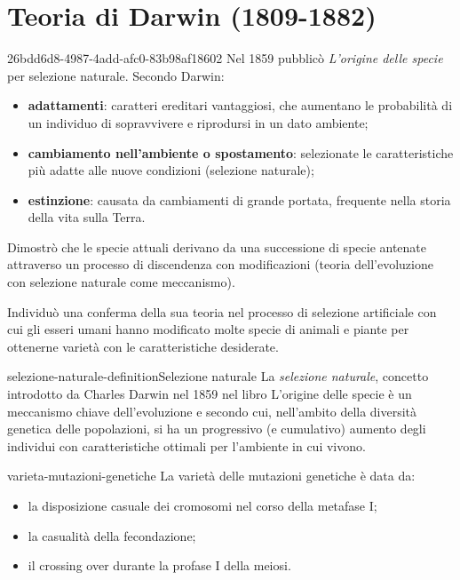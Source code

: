 \documentclass[preview]{standalone}
\begin{document}
\section{Teoria di Darwin (1809-1882)}

\begin{snippet}{26bdd6d8-4987-4add-afc0-83b98af18602}
    Nel 1859 pubblicò \textit{L'origine delle specie} per selezione naturale.
    Secondo Darwin:
    \begin{itemize}
        \item \textbf{adattamenti}: caratteri ereditari vantaggiosi, che aumentano le
            probabilità di un individuo di sopravvivere e riprodursi in un dato
            ambiente;
        \item \textbf{cambiamento nell'ambiente o spostamento}: selezionate le
        caratteristiche più adatte alle nuove condizioni (selezione naturale);
        \item \textbf{estinzione}: causata da cambiamenti di grande portata, frequente nella
        storia della vita sulla Terra.
    \end{itemize}

    Dimostrò che le specie attuali derivano da una successione di specie
    antenate attraverso un processo di discendenza con modificazioni
    (teoria dell'evoluzione con selezione naturale come meccanismo).

    Individuò una conferma della sua teoria nel processo di selezione
    artificiale con cui gli esseri umani hanno modificato molte specie di
    animali e piante per ottenerne varietà con le caratteristiche desiderate.
\end{snippet}

\begin{snippetdefinition}{selezione-naturale-definition}{Selezione naturale}
    La \textit{selezione naturale}, concetto introdotto da Charles Darwin
    nel 1859 nel libro L'origine delle specie è un meccanismo chiave dell'evoluzione
    e secondo cui, nell'ambito della diversità genetica delle popolazioni,
    si ha un progressivo (e cumulativo) aumento degli individui con caratteristiche
    ottimali per l'ambiente in cui vivono.
\end{snippetdefinition}

\begin{snippet}{varieta-mutazioni-genetiche}
    La varietà delle mutazioni genetiche è data da:
    \begin{itemize}
        \item la disposizione casuale dei cromosomi nel corso della metafase I;
        \item la casualità della fecondazione;
        \item il crossing over durante la profase I della meiosi.
    \end{itemize}
\end{snippet}
\end{document}
